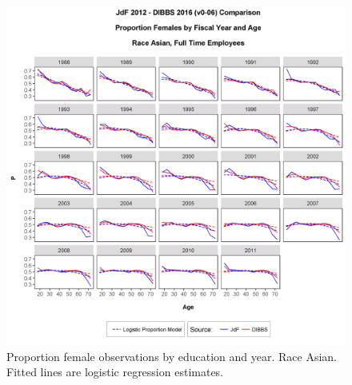 \documentclass[10pt, letterpaper]{article}
\begin{document}
\begin{spacing}{1.0}
\begin{figure}[h]
    \centering
    \includegraphics[width=6.5in, trim={0 0 0 1in}, clip]{GenderProportionLogisticModelFYRaceAgeBv0-06.png}
    \caption{Proportion female observations by education and year.  Race Asian.  Fitted lines are logistic regression estimates.}
    \label{figure:GenderProportionLogisticModelFYRaceAgeB}
\end{figure}

\clearpage


\end{spacing}
\end{document}
